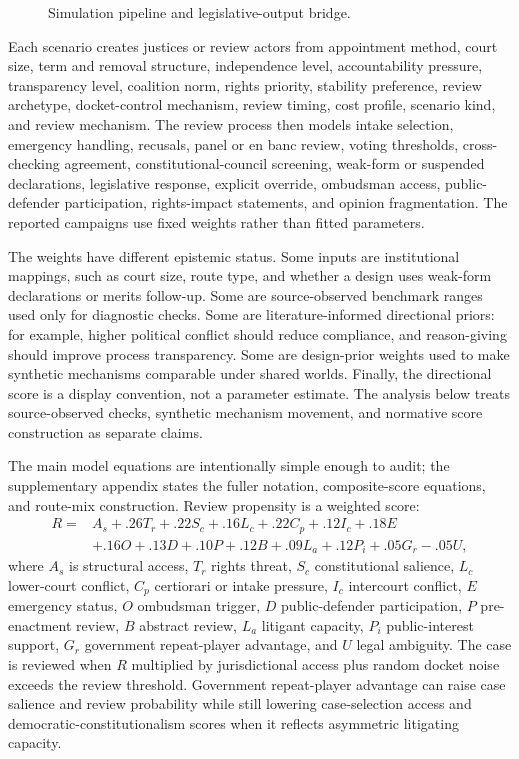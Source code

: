 \documentclass[
  journal=small,
  manuscript=research-article,
  year=2026
]{cup-journal}
\begin{document}
\begin{figure}[hbt!]
\centering

\caption{Simulation pipeline and legislative-output bridge.}
\label{fig:model-pipeline}
\end{figure}

Each scenario creates justices or review actors from appointment method, court size, term and removal structure, independence level, accountability pressure, transparency level, coalition norm, rights priority, stability preference, review archetype, docket-control mechanism, review timing, cost profile, scenario kind, and review mechanism. The review process then models intake selection, emergency handling, recusals, panel or en banc review, voting thresholds, cross-checking agreement, constitutional-council screening, weak-form or suspended declarations, legislative response, explicit override, ombudsman access, public-defender participation, rights-impact statements, and opinion fragmentation. The reported campaigns use fixed weights rather than fitted parameters.

The weights have different epistemic status. Some inputs are institutional mappings, such as court size, route type, and whether a design uses weak-form declarations or merits follow-up. Some are source-observed benchmark ranges used only for diagnostic checks. Some are literature-informed directional priors: for example, higher political conflict should reduce compliance, and reason-giving should improve process transparency. Some are design-prior weights used to make synthetic mechanisms comparable under shared worlds. Finally, the directional score is a display convention, not a parameter estimate. The analysis below treats source-observed checks, synthetic mechanism movement, and normative score construction as separate claims.

The main model equations are intentionally simple enough to audit; the supplementary appendix states the fuller notation, composite-score equations, and route-mix construction. Review propensity is a weighted score:
\[
\begin{aligned}
R={}&A_s+.26T_r+.22S_c+.16L_c+.22C_p+.12I_c+.18E\\
&+.16O+.13D+.10P+.12B+.09L_a+.12P_i+.05G_r-.05U,
\end{aligned}
\]
where $A_s$ is structural access, $T_r$ rights threat, $S_c$ constitutional salience, $L_c$ lower-court conflict, $C_p$ certiorari or intake pressure, $I_c$ intercourt conflict, $E$ emergency status, $O$ ombudsman trigger, $D$ public-defender participation, $P$ pre-enactment review, $B$ abstract review, $L_a$ litigant capacity, $P_i$ public-interest support, $G_r$ government repeat-player advantage, and $U$ legal ambiguity. The case is reviewed when $R$ multiplied by jurisdictional access plus random docket noise exceeds the review threshold. Government repeat-player advantage can raise case salience and review probability while still lowering case-selection access and democratic-constitutionalism scores when it reflects asymmetric litigating capacity.
\end{document}
